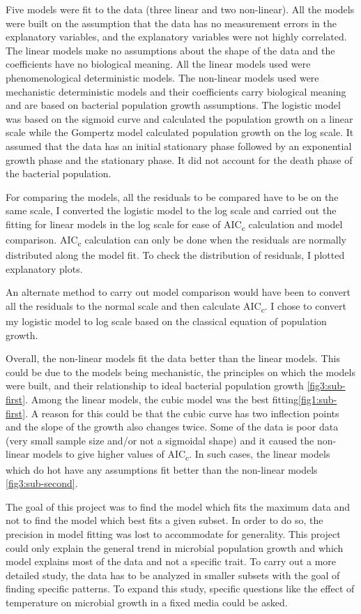 \documentclass[11pt]{article}
\begin{document}
Five models were fit to the data (three linear and two non-linear). All the models were built on the assumption that the data has no measurement errors in the explanatory variables, and the explanatory variables were not highly correlated. The linear models make no assumptions about the shape of the data and the coefficients have no biological meaning. All the linear models used were phenomenological deterministic models. The non-linear models used were mechanistic deterministic models and their coefficients carry biological meaning and are based on bacterial population growth assumptions. The logistic model was based on the sigmoid curve and calculated the population growth on a linear scale while the Gompertz model calculated population growth on the log scale. It assumed that the data has an initial stationary phase followed by an exponential growth phase and the stationary phase. It did not account for the death phase of the bacterial population. 

For comparing the models, all the residuals to be compared have to be on the same scale, I converted the logistic model to the log scale and carried out the fitting for linear models in the log scale for ease of AIC\textsubscript{c} calculation and model comparison. AIC\textsubscript{c} calculation can only be done when the residuals are normally distributed along the model fit. To check the distribution of residuals, I plotted explanatory plots. 

An alternate method to carry out model comparison would have been to convert all the residuals to the normal scale and then calculate AIC\textsubscript{c}.
I chose to convert my logistic model to log scale based on the classical equation of population growth. 

Overall, the non-linear models fit the data better than the linear models. This could be due to the models being mechanistic, the principles on which the models were built, and their relationship to ideal bacterial population growth \ref{fig3:sub-first}. Among the linear models, the cubic model was the best fitting\ref{fig1:sub-first}. A reason for this could be that the cubic curve has two inflection points and the slope of the growth also changes twice. Some of the data is poor data (very small sample size and/or not a sigmoidal shape) and it caused the non-linear models to give higher values of AIC\textsubscript{c}. In such cases, the linear models which do hot have any assumptions fit better than the non-linear models \ref{fig3:sub-second}.

The goal of this project was to find the model which fits the maximum data and not to find the model which best fits a given subset. In order to do so, the precision in model fitting was lost \cite{10.2307/27836590} to accommodate for generality. This project could only explain the general trend in microbial population growth and which model explains most of the data and not a specific trait. To carry out a more detailed study, the data has to be analyzed in smaller subsets with the goal of finding specific patterns. To expand this study, specific questions like the effect of temperature on microbial growth in a fixed media could be asked. 



\end{document}
